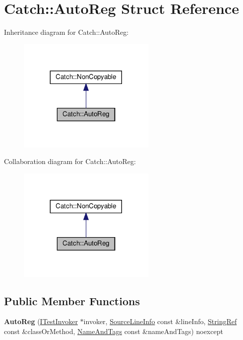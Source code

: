\hypertarget{structCatch_1_1AutoReg}{}\section{Catch\+::Auto\+Reg Struct Reference}
\label{structCatch_1_1AutoReg}


Inheritance diagram for Catch\+::Auto\+Reg\+:\nopagebreak
\begin{figure}[H]
\begin{center}
\leavevmode
\includegraphics[width=188pt]{structCatch_1_1AutoReg__inherit__graph}
\end{center}
\end{figure}


Collaboration diagram for Catch\+::Auto\+Reg\+:\nopagebreak
\begin{figure}[H]
\begin{center}
\leavevmode
\includegraphics[width=188pt]{structCatch_1_1AutoReg__coll__graph}
\end{center}
\end{figure}
\subsection*{Public Member Functions}
\begin{DoxyCompactItemize}
\item 
\mbox{\label{structCatch_1_1AutoReg_a7eba02fb9d80b9896bf5a6517369af28}} 
{\bfseries Auto\+Reg} (\mbox{\hyperlink{structCatch_1_1ITestInvoker}{I\+Test\+Invoker}} $\ast$invoker, \mbox{\hyperlink{structCatch_1_1SourceLineInfo}{Source\+Line\+Info}} const \&line\+Info, \mbox{\hyperlink{classCatch_1_1StringRef}{String\+Ref}} const \&class\+Or\+Method, \mbox{\hyperlink{structCatch_1_1NameAndTags}{Name\+And\+Tags}} const \&name\+And\+Tags) noexcept
\end{DoxyCompactItemize}


